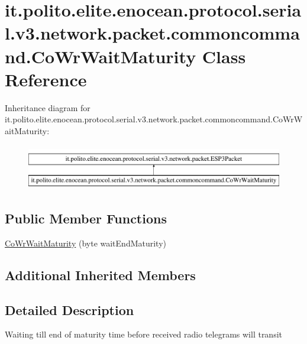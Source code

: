 \hypertarget{classit_1_1polito_1_1elite_1_1enocean_1_1protocol_1_1serial_1_1v3_1_1network_1_1packet_1_1commoncommand_1_1_co_wr_wait_maturity}{}\section{it.\+polito.\+elite.\+enocean.\+protocol.\+serial.\+v3.\+network.\+packet.\+commoncommand.\+Co\+Wr\+Wait\+Maturity Class Reference}
\label{classit_1_1polito_1_1elite_1_1enocean_1_1protocol_1_1serial_1_1v3_1_1network_1_1packet_1_1commoncommand_1_1_co_wr_wait_maturity}
Inheritance diagram for it.\+polito.\+elite.\+enocean.\+protocol.\+serial.\+v3.\+network.\+packet.\+commoncommand.\+Co\+Wr\+Wait\+Maturity\+:\begin{figure}[H]
\begin{center}
\leavevmode
\includegraphics[height=2.000000cm]{classit_1_1polito_1_1elite_1_1enocean_1_1protocol_1_1serial_1_1v3_1_1network_1_1packet_1_1commoncommand_1_1_co_wr_wait_maturity}
\end{center}
\end{figure}
\subsection*{Public Member Functions}
\begin{DoxyCompactItemize}
\item 
\hyperlink{classit_1_1polito_1_1elite_1_1enocean_1_1protocol_1_1serial_1_1v3_1_1network_1_1packet_1_1commoncommand_1_1_co_wr_wait_maturity_a0849d14ee4665bde1acb3ab3ef6c8a7d}{Co\+Wr\+Wait\+Maturity} (byte wait\+End\+Maturity)
\end{DoxyCompactItemize}
\subsection*{Additional Inherited Members}


\subsection{Detailed Description}
Waiting till end of maturity time before received radio telegrams will transit

